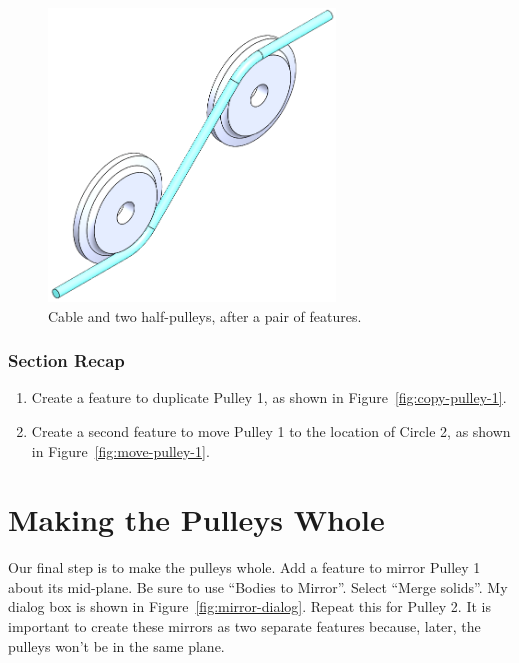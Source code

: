 \begin{figure}[H]
\begin{center}
  \includegraphics[width=3in]{images/figures/cable-and-half-pulleys.png}
\end{center}
\caption{Cable and two half-pulleys, after a pair of  features.
\label{fig:cable-and-half-pulleys}}

\end{figure}

\subsubsection{Section Recap}

\begin{enumerate}
\item{} Create a  feature to duplicate Pulley 1, as shown in
Figure~\ref{fig:copy-pulley-1}.
\item{} Create a second  feature to move Pulley 1 to the location of
Circle 2, as shown in Figure~\ref{fig:move-pulley-1}.
\end{enumerate}

\section{Making the Pulleys Whole}

\label{sec:mirror_pulleys}

Our final step is to make the pulleys whole. Add a  feature
to mirror Pulley 1 about its mid-plane. Be sure to use ``Bodies to Mirror''. Select ``Merge solids''. My
 dialog box is shown in Figure~\ref{fig:mirror-dialog}. Repeat this for
Pulley 2. It is important to create these mirrors as two separate features
because, later, the pulleys won't be in the same plane.

